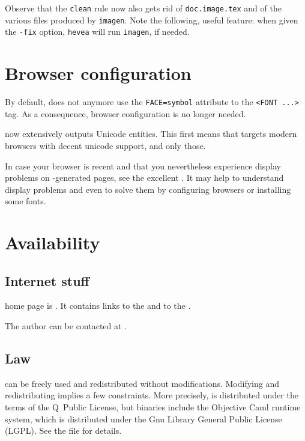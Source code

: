 Observe that the \texttt{clean} rule now also gets rid of
\texttt{doc.image.tex} and of the various files produced by
\texttt{imagen}. Note the following, useful feature:
when given the \verb+-fix+ option, \texttt{hevea} will run
\texttt{imagen}, if needed.


\section{Browser \label{browser}configuration}
%
%
By default, \hevea{} does not anymore use the \verb+FACE=symbol+
attribute to the \verb+<FONT ...>+ tag.  As a consequence, browser
configuration is no longer needed.

%
\hevea{} now extensively outputs Unicode entities.
This first means that \hevea{} targets modern browsers with
decent unicode support, and only those.

In case your browser is recent and that you nevertheless experience display
problems on \hevea{}-generated pages, see the excellent
.
It may help to understand display  problems and even to solve them
by configuring browsers or installing some fonts.

\section{Availability}

\subsection{Internet stuff}

\hevea{} home page is \ahrefurl{\httpbase}. It contains links to the
and to the .

The author can be contacted at .

\subsection{Law}
\hevea{} can be freely used and redistributed without modifications.
Modifying and redistributing \hevea{} implies a few constraints.
More precisely, \hevea{} is distributed under the terms of the
Q~Public License, but \hevea{} binaries include the Objective Caml
runtime system, which is distributed under the Gnu Library General
Public License (LGPL).
See the  file for details.

